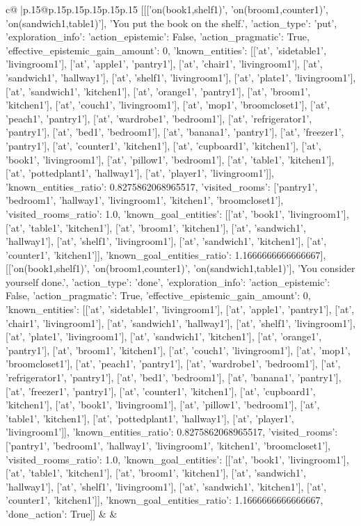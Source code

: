 \documentclass{article}
\begin{document}
{\begin{supertabular}{c@{$\;$}|p{.15\linewidth}@{}p{.15\linewidth}p{.15\linewidth}p{.15\linewidth}p{.15\linewidth}p{.15\linewidth}}
{{{	 [[['on(book1,shelf1)', 'on(broom1,counter1)', 'on(sandwich1,table1)'], 'You put the book on the shelf.', {'action_type': 'put', 'exploration_info': {'action_epistemic': False, 'action_pragmatic': True, 'effective_epistemic_gain_amount': 0, 'known_entities': [['at', 'sidetable1', 'livingroom1'], ['at', 'apple1', 'pantry1'], ['at', 'chair1', 'livingroom1'], ['at', 'sandwich1', 'hallway1'], ['at', 'shelf1', 'livingroom1'], ['at', 'plate1', 'livingroom1'], ['at', 'sandwich1', 'kitchen1'], ['at', 'orange1', 'pantry1'], ['at', 'broom1', 'kitchen1'], ['at', 'couch1', 'livingroom1'], ['at', 'mop1', 'broomcloset1'], ['at', 'peach1', 'pantry1'], ['at', 'wardrobe1', 'bedroom1'], ['at', 'refrigerator1', 'pantry1'], ['at', 'bed1', 'bedroom1'], ['at', 'banana1', 'pantry1'], ['at', 'freezer1', 'pantry1'], ['at', 'counter1', 'kitchen1'], ['at', 'cupboard1', 'kitchen1'], ['at', 'book1', 'livingroom1'], ['at', 'pillow1', 'bedroom1'], ['at', 'table1', 'kitchen1'], ['at', 'pottedplant1', 'hallway1'], ['at', 'player1', 'livingroom1']], 'known_entities_ratio': 0.8275862068965517, 'visited_rooms': ['pantry1', 'bedroom1', 'hallway1', 'livingroom1', 'kitchen1', 'broomcloset1'], 'visited_rooms_ratio': 1.0, 'known_goal_entities': [['at', 'book1', 'livingroom1'], ['at', 'table1', 'kitchen1'], ['at', 'broom1', 'kitchen1'], ['at', 'sandwich1', 'hallway1'], ['at', 'shelf1', 'livingroom1'], ['at', 'sandwich1', 'kitchen1'], ['at', 'counter1', 'kitchen1']], 'known_goal_entities_ratio': 1.1666666666666667}}], [['on(book1,shelf1)', 'on(broom1,counter1)', 'on(sandwich1,table1)'], 'You consider yourself done.', {'action_type': 'done', 'exploration_info': {'action_epistemic': False, 'action_pragmatic': True, 'effective_epistemic_gain_amount': 0, 'known_entities': [['at', 'sidetable1', 'livingroom1'], ['at', 'apple1', 'pantry1'], ['at', 'chair1', 'livingroom1'], ['at', 'sandwich1', 'hallway1'], ['at', 'shelf1', 'livingroom1'], ['at', 'plate1', 'livingroom1'], ['at', 'sandwich1', 'kitchen1'], ['at', 'orange1', 'pantry1'], ['at', 'broom1', 'kitchen1'], ['at', 'couch1', 'livingroom1'], ['at', 'mop1', 'broomcloset1'], ['at', 'peach1', 'pantry1'], ['at', 'wardrobe1', 'bedroom1'], ['at', 'refrigerator1', 'pantry1'], ['at', 'bed1', 'bedroom1'], ['at', 'banana1', 'pantry1'], ['at', 'freezer1', 'pantry1'], ['at', 'counter1', 'kitchen1'], ['at', 'cupboard1', 'kitchen1'], ['at', 'book1', 'livingroom1'], ['at', 'pillow1', 'bedroom1'], ['at', 'table1', 'kitchen1'], ['at', 'pottedplant1', 'hallway1'], ['at', 'player1', 'livingroom1']], 'known_entities_ratio': 0.8275862068965517, 'visited_rooms': ['pantry1', 'bedroom1', 'hallway1', 'livingroom1', 'kitchen1', 'broomcloset1'], 'visited_rooms_ratio': 1.0, 'known_goal_entities': [['at', 'book1', 'livingroom1'], ['at', 'table1', 'kitchen1'], ['at', 'broom1', 'kitchen1'], ['at', 'sandwich1', 'hallway1'], ['at', 'shelf1', 'livingroom1'], ['at', 'sandwich1', 'kitchen1'], ['at', 'counter1', 'kitchen1']], 'known_goal_entities_ratio': 1.1666666666666667}, 'done_action': True}]] 
	  } 
	   } 
	   } 
	 & & \\ 
 


\end{supertabular}}
\end{document}
